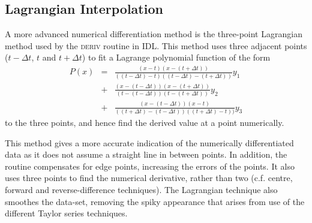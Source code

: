 \documentclass[namedreferences]{SolarPhysics}
\begin{document}
\begin{article}
\subsection{Lagrangian Interpolation}

A more advanced numerical differentiation method is the three-point Lagrangian method used by the \textsc{deriv} routine in IDL. This method uses three adjacent points ($t-\Delta t$, $t$ and $t+\Delta t$) to fit a Lagrange polynomial function of the form
\begin{eqnarray}
P(x) &=& \frac{(x - t)(x - (t+\Delta t))}{((t-\Delta t) - t)((t-\Delta t)- (t+\Delta t))}y_{1} \nonumber \\
&+& \frac{(x - (t-\Delta t))(x - (t+\Delta t))}{(t - (t-\Delta t))(t - (t+\Delta t))}y_{2} \nonumber \\ 
&+& \frac{(x - (t-\Delta t))(x - t)}{((t+\Delta t) - (t-\Delta t))((t+\Delta t) - t))}y_{3}
\end{eqnarray}
to the three points, and hence find the derived value at a point numerically.

This method gives a more accurate indication of the numerically differentiated data as it does not assume a straight line in between points. In addition, the routine compensates for edge points, increasing the errors of the points. It also uses three points to find the numerical derivative, rather than two (c.f. centre, forward and reverse-difference techniques). The Lagrangian technique also smoothes the data-set, removing the spiky appearance that arises from use of the different Taylor series techniques.



\end{article}
\end{document}
